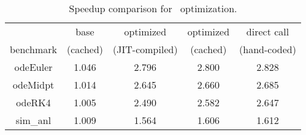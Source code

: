 \begin{table}
    \begin{tabular}{ |c|c|c|c|c| }
        \hline
         & base & optimized & optimized & direct call \\ 
        benchmark & (cached) & (JIT-compiled) & (cached) & (hand-coded) \\
        \hline
        \hline
        odeEuler & 1.046 & 2.796 & 2.800 & 2.828 \\ 
        \hline
        odeMidpt & 1.014 & 2.645 & 2.660 & 2.685 \\ 
        \hline
        odeRK4 & 1.005 & 2.490 & 2.582 & 2.647 \\ 
        \hline
        sim_anl & 1.009 & 1.564 & 1.606 & 1.612 \\ 
        \hline
    \end{tabular} 
    \caption{Speedup comparison for \feval\ optimization.} 
\end{table}  
  
  
  
  
  
  
  
  
  
  
  
  
  
  
  
  
  
  